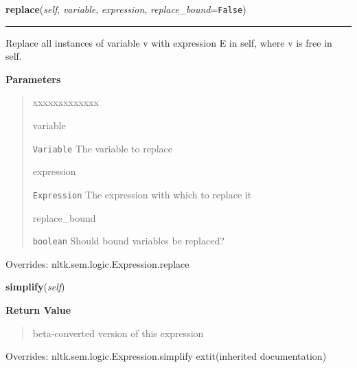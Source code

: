 \hspace{.8\funcindent}\begin{boxedminipage}{\funcwidth}

    \raggedright \textbf{replace}(\textit{self}, \textit{variable}, \textit{expression}, \textit{replace\_bound}={\tt False})

    \vspace{-1.5ex}

    \rule{\textwidth}{0.5\fboxrule}
\setlength{\parskip}{2ex}
    Replace all instances of variable v with expression E in self, where v 
    is free in self.

\setlength{\parskip}{1ex}
      \textbf{Parameters}
      \vspace{-1ex}

      \begin{quote}
        \begin{Ventry}{xxxxxxxxxxxxx}

          \item[variable]

          \texttt{Variable} The variable to replace

          \item[expression]

          \texttt{Expression} The expression with which to replace it

          \item[replace\_bound]

          \texttt{boolean} Should bound variables be replaced?

        \end{Ventry}

      \end{quote}

      Overrides: nltk.sem.logic.Expression.replace

    \end{boxedminipage}

    \vspace{0.5ex}

\hspace{.8\funcindent}\begin{boxedminipage}{\funcwidth}

    \raggedright \textbf{simplify}(\textit{self})

\setlength{\parskip}{2ex}
\setlength{\parskip}{1ex}
      \textbf{Return Value}
    \vspace{-1ex}

      \begin{quote}
      beta-converted version of this expression

      \end{quote}

      Overrides: nltk.sem.logic.Expression.simplify 	extit{(inherited documentation)}

    \end{boxedminipage}



